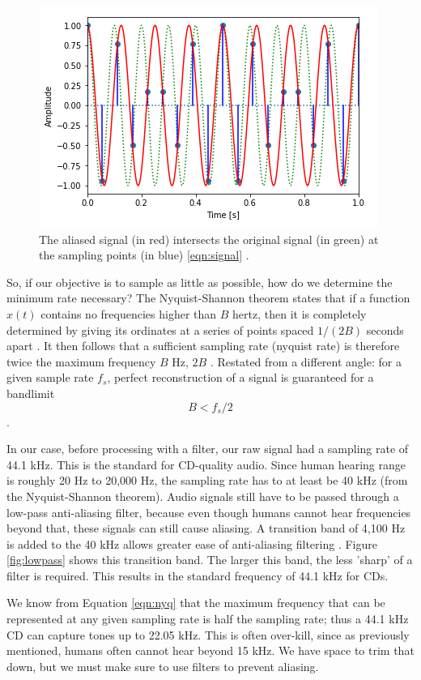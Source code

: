 \begin{figure}[H]
	\centering
	\includegraphics[scale = 1]{images/aliased_curve.png} %
	
 \caption{
	The aliased signal (in red) intersects the original
 	signal (in green) at the sampling points (in blue)
	\ref{eqn:signal} \cite{notebook:sampling}.
	} 
 	\label{fig:aliase}  
 \end{figure}

So, if our objective is to sample as little as possible, how do
we determine the minimum rate necessary? The Nyquist-Shannon theorem states that if a function $x ( t )$ contains no
frequencies higher than $B$ hertz, then it is completely determined by
giving its ordinates at a series of points spaced $1 / ( 2 B )$
seconds apart \cite{shannon:wiki}. It then follows that a sufficient sampling rate (nyquist rate) is therefore twice the maximum frequency $B$ Hz, $2B$ \cite{shannon:wiki}.
Restated from a different angle: for a given sample rate $f_{s}$, perfect reconstruction of a signal is guaranteed for a bandlimit 
\begin{equation}
B<f_{s}/2
\label{eqn:nyq}
\end{equation}
 \cite{shannon:wiki}.


In our case, before processing with a filter, our raw signal had
a sampling rate of 44.1 kHz. This is the standard for CD-quality
audio. Since human hearing range is roughly 20 Hz to 20,000 Hz, the sampling rate has to at least be 40 kHz (from the Nyquist-Shannon theorem). Audio signals still have to be passed through a low-pass anti-aliasing filter, because even though humans cannot hear frequencies beyond that, these signals can still cause aliasing. A transition band of 4,100 Hz is added to the 40 kHz allows greater ease of anti-aliasing filtering \cite{cd:wiki}. Figure \ref{fig:lowpass} shows this transition band.  The larger this band, the less 'sharp' of a filter is required. This results in the standard frequency of 44.1 kHz for CDs.



We know from Equation \ref{eqn:nyq} that the maximum
frequency that can be represented at any given sampling rate is
half the sampling rate; thus a 44.1 kHz CD can capture tones up
to 22.05 kHz. This is often over-kill, since as previously
mentioned, humans often cannot hear beyond 15 kHz. We have space
to trim that down, but we must make sure to use filters to
prevent aliasing.
